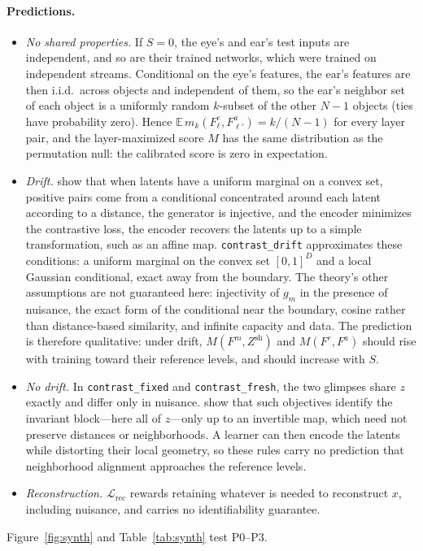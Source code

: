 \documentclass[11pt]{article}
\begin{document}
\paragraph{Predictions.}
\begin{itemize}
  \item[\textbf{P0}] \emph{No shared properties.} If $S=0$, the eye's and ear's test inputs are independent, and so are their trained networks, which were trained on independent streams. Conditional on the eye's features, the ear's features are then i.i.d.\ across objects and independent of them, so the ear's neighbor set of each object is a uniformly random $k$-subset of the other $N-1$ objects (ties have probability zero). Hence $\mathbb E\,m_k(F^e_\ell,F^a_{\ell'})=k/(N-1)$ for every layer pair, and the layer-maximized score $M$ has the same distribution as the permutation null: the calibrated score is zero in expectation.
  \item[\textbf{P1}] \emph{Drift.} \citet{zimmermann2021contrastive} show that when latents have a uniform marginal on a convex set, positive pairs come from a conditional concentrated around each latent according to a distance, the generator is injective, and the encoder minimizes the contrastive loss, the encoder recovers the latents up to a simple transformation, such as an affine map. \texttt{contrast\_drift} approximates these conditions: a uniform marginal on the convex set $[0,1]^D$ and a local Gaussian conditional, exact away from the boundary. The theory's other assumptions are not guaranteed here: injectivity of $g_m$ in the presence of nuisance, the exact form of the conditional near the boundary, cosine rather than distance-based similarity, and infinite capacity and data. The prediction is therefore qualitative: under drift, $M(F^m,Z^{\mathrm{sh}})$ and $M(F^e,F^a)$ should rise with training toward their reference levels, and should increase with $S$.
  \item[\textbf{P2}] \emph{No drift.} In \texttt{contrast\_fixed} and \texttt{contrast\_fresh}, the two glimpses share $z$ exactly and differ only in nuisance. \citet{vonkugelgen2021self} show that such objectives identify the invariant block---here all of $z$---only up to an invertible map, which need not preserve distances or neighborhoods. A learner can then encode the latents while distorting their local geometry, so these rules carry no prediction that neighborhood alignment approaches the reference levels.
  \item[\textbf{P3}] \emph{Reconstruction.} $\mathcal L_{\mathrm{rec}}$ rewards retaining whatever is needed to reconstruct $x$, including nuisance, and carries no identifiability guarantee.
\end{itemize}
Figure~\ref{fig:synth} and Table~\ref{tab:synth} test P0--P3.
\end{document}
